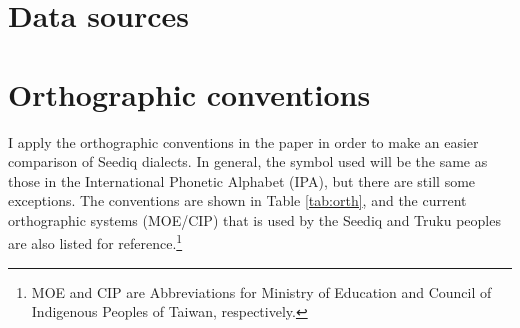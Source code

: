 \section{Data sources}
\lipsum[1-3]

\section{Orthographic conventions}

I apply the orthographic conventions in the paper in order to make an easier comparison of Seediq dialects. In general, the symbol used will be the same as those in the International Phonetic Alphabet (IPA), but there are still some exceptions. The conventions are shown in Table \ref{tab:orth}, and the current orthographic systems (MOE/CIP) that is used by the Seediq and Truku peoples are also listed for reference.\footnote{MOE and CIP are Abbreviations for Ministry of Education and Council of Indigenous Peoples of Taiwan, respectively.} 

